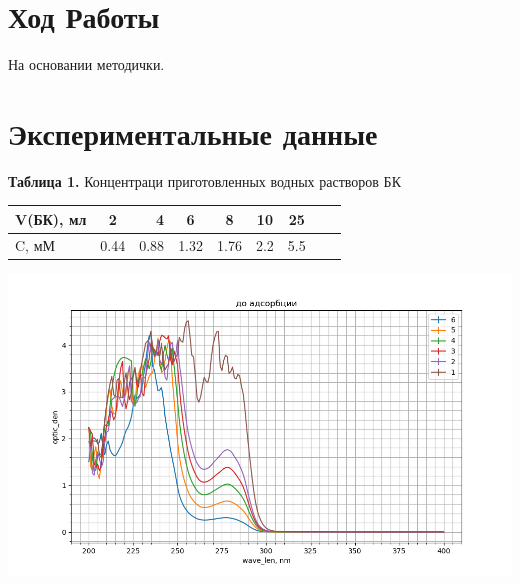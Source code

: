 \documentclass[a4paper]{article}
\begin{document}
\par \vspace{1cm}

\section{\LARGE Ход Работы}

На основании методички. \par \vspace{0.3cm}
\section{\LARGE \textbf{Экспериментальные данные}}
\vspace{1.5 cm}

\par

\begin{center}
\textbf{Таблица 1.} Концентраци приготовленных водных растворов БК

\vspace{0.3cm}
\begin{tabular}{|l|c|r|c|c|c|c|c|c|}
    \hline
    V(БК), мл & 2 & 4 & 6 & 8 & 10 & 25\\
    \hline
    C, мМ & 0.44 & 0.88 & 1.32 & 1.76 & 2.2 & 5.5\\
    \hline
     
\end{tabular}
\end{center}

\graphicspath{{./}}
		\begin{center}
		
			\includegraphics[scale=0.8]{gr_without.png}
	

	\par
 \vspace{0.3cm}
 \end{center}
\vspace{0.3cm}
\par
\end{document}
